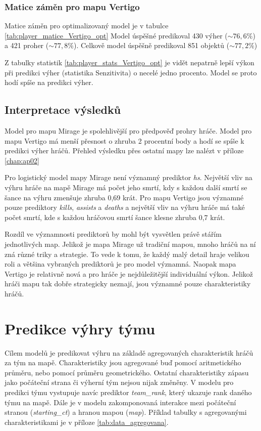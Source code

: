 
\subsubsection{Matice záměn pro mapu Vertigo}



Matice záměn pro optimalizovaný model je v tabulce \ref{tab:player_matice_Vertigo_opt}
Model úspěšné predikoval 430 výher ($\sim 76,6 \%$) a 421 proher ($\sim 77,8 \%$). Celkově model úspěšně predikoval 851 objektů ($\sim 77,2 \%$)



Z tabulky statistik \ref{tab:player_stats_Vertigo_opt} je vidět nepatrně lepší výkon při predikci výher (statistika Senzitivita) o necelé jedno procento.
Model se proto hodí spíše na predikci výher.

\subsection{Interpretace výsledků}
Model pro mapu Mirage je spolehlivější pro předpověď prohry hráče. Model pro mapu Vertigo má menší přesnost o zhruba 
2 procentní body a hodí se spíše k predikci výher hráčů.
Přehled výsledku přes ostatní mapy lze nalézt v příloze \ref{chap:ap02}

Pro logistický model mapy Mirage není významný prediktor \textit{hs}. Největší vliv na výhru hráče na mapě Mirage má počet jeho smrtí, kdy s každou další smrtí se šance
na výhru zmenšuje zhruba 0,69 krát. Pro mapu Vertigo jsou významné pouze prediktory \textit{kills}, \textit{assists} a \textit{deaths} a největší vliv na výhru hráče
má také počet smrtí, kde s každou hráčovou smrtí šance klesne zhruba 0,7 krát.

Rozdíl
ve významnosti prediktorů
by mohl být vysvětlen právě stářím jednotlivých map. Jelikož je mapa Mirage už tradiční mapou, mnoho hráčů na ní zná různé triky a strategie. To vede k tomu, že
každý malý detail hraje velikou roli a většina vybraných prediktorů je pro model významná. Naopak mapa Vertigo je relativně nová a pro hráče je nejdůležitější individuální
výkon. Jelikož hráči mapu tak dobře strategicky neznají, jsou významné pouze charakteristiky hráčů.

\newpage
\section{Predikce výhry týmu}
Cílem modelů je predikovat výhru na základě agregovaných charakteristik hráčů za tým na mapě. Charakteristiky jsou agregované buď pomocí aritmetického průměru,
nebo pomocí průměru geometrického. Ostatní charakteristiky zápasu jako počáteční strana či výherní tým nejsou nijak změněny. V modelu pro predikci týmu vystupuje
navíc prediktor \textit{team\_rank}, který ukazuje rank daného týmu na mapě. Dále je v modelu zakomponovaná interakce
mezi počáteční stranou (\textit{starting\_ct}) a hranou mapou (\textit{map}). Příklad tabulky s agregovanými charakteristikami je v příloze \ref{tab:data_agregovana}.

